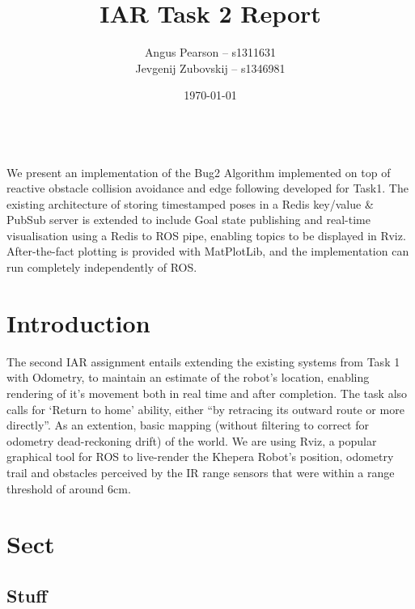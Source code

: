 \documentclass[11pt, a4paper]{article}
\renewenvironment{abstract}{%
{\mdseries\scshape\Large\abstractname}
\vspace{1em}\\
}{\par\noindent}
\begin{document}
\title{IAR Task 2 Report}
\author{Angus Pearson -- s1311631\\ Jevgenij Zubovskij -- s1346981}
\date{\today}
\maketitle



\begin{abstract}
  We present an implementation of the Bug2 \cite{principlesrobot} Algorithm implemented 
  on top  of reactive obstacle collision avoidance and edge following developed for Task1.
  The existing architecture of storing timestamped poses in a Redis \cite{Redis} key/value 
  \& PubSub server is extended to include Goal state publishing and real-time visualisation 
  using a Redis to ROS \cite{ROS} pipe, enabling topics to be displayed in Rviz. 
  After-the-fact plotting is provided with MatPlotLib, and the implementation can run 
  completely independently of ROS.
\end{abstract}



\section{Introduction}

The second IAR assignment entails extending the existing systems from Task 1 with Odometry, 
to maintain an estimate of the robot's location, enabling rendering of it's movement both 
in real time and after completion. The task also calls for `Return to home' ability, either 
``by retracing its outward route or more directly''. As an extention, basic mapping (without
filtering to correct for odometry dead-reckoning drift) of the world. We are using Rviz, a 
popular graphical tool for ROS to live-render the Khepera Robot's position, odometry trail
and obstacles perceived by the IR range sensors that were within a range threshold of around 
6cm.



\section{Sect}

\subsection{Stuff}
\end{document}
